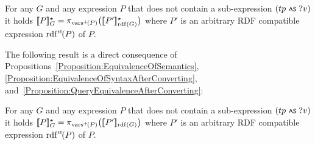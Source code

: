 \begin{proposition} \label{Proposition:QueryEquivalenceAfterConverting}
	For any {\RDFplusGraph} $G$ and any {\SPARQLplus} expression $P$ that does not contain a sub-expression
	$(tp \text{ \normalfont\scriptsize\textsf{AS} } ?v)$ it holds $[\![P]\!]^\star_{G} = \pi_{\mathrm{vars}^+\!(P)}\bigl( [\![P']\!]^\star_{\mathrm{rdf}(G)} \bigr)$ where $P'$ is an arbitrary RDF compatible expression $\mathrm{rdf}^{w}\!(P)$ of $P$.
\end{proposition}

\noindent
The following result is a direct consequence of Propositions~\ref{Proposition:EquivalenceOfSemantics}, \ref{Proposition:EquivalenceOfSyntaxAfterConverting}, and~\ref{Proposition:QueryEquivalenceAfterConverting}:
\begin{corollary}
	For any {\RDFplusGraph} $G$ and any {\SPARQLplus} expression $P$ that does not contain a sub-expression
	$(tp \text{ \normalfont\scriptsize\textsf{AS} } ?v)$ it holds $[\![P]\!]^\star_{G} = \pi_{\mathrm{vars}^+\!(P)}\bigl( [\![P']\!]_{\mathrm{rdf}(G)} \bigr)$ where $P'$ is an arbitrary RDF compatible expression $\mathrm{rdf}^{w}\!(P)$ of $P$.
\end{corollary}

\noindent
{}